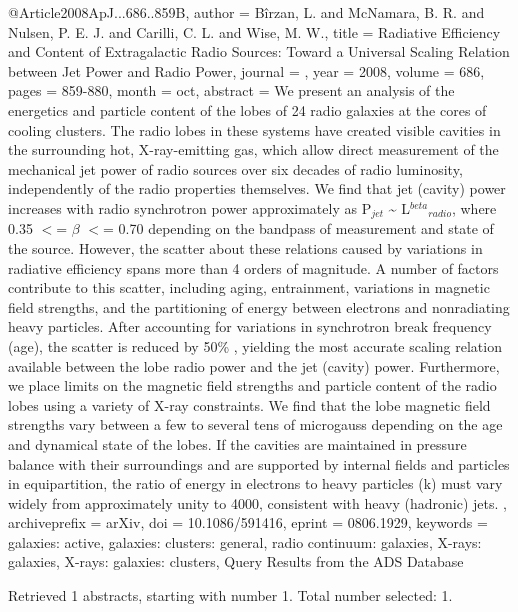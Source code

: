 \documentclass[longauth]{aa}
\begin{document}
{{{{{{{{{{@Article{2008ApJ...686..859B,
  author        = {B{\^i}rzan, L. and McNamara, B. R. and Nulsen, P. E. J. and Carilli, C. L. and Wise, M. W.},
  title         = {Radiative Efficiency and Content of Extragalactic Radio Sources: Toward a Universal Scaling Relation between Jet Power and Radio Power},
  journal       = {\apj},
  year          = {2008},
  volume        = {686},
  pages         = {859-880},
  month         = oct,
  abstract      = {We present an analysis of the energetics and particle content of the
lobes of 24 radio galaxies at the cores of cooling clusters. The radio
lobes in these systems have created visible cavities in the surrounding
hot, X-ray-emitting gas, which allow direct measurement of the
mechanical jet power of radio sources over six decades of radio
luminosity, independently of the radio properties themselves. We find
that jet (cavity) power increases with radio synchrotron power
approximately as P$_{jet}$ \~{} L$^{beta}$$_{radio}$,
where 0.35 $\lt$= {$\beta$} $\lt$= 0.70 depending on the bandpass of
measurement and state of the source. However, the scatter about these
relations caused by variations in radiative efficiency spans more than 4
orders of magnitude. A number of factors contribute to this scatter,
including aging, entrainment, variations in magnetic field strengths,
and the partitioning of energy between electrons and nonradiating heavy
particles. After accounting for variations in synchrotron break
frequency (age), the scatter is reduced by {\ap}50\% , yielding the most
accurate scaling relation available between the lobe radio power and the
jet (cavity) power. Furthermore, we place limits on the magnetic field
strengths and particle content of the radio lobes using a variety of
X-ray constraints. We find that the lobe magnetic field strengths vary
between a few to several tens of microgauss depending on the age and
dynamical state of the lobes. If the cavities are maintained in pressure
balance with their surroundings and are supported by internal fields and
particles in equipartition, the ratio of energy in electrons to heavy
particles (k) must vary widely from approximately unity to 4000,
consistent with heavy (hadronic) jets.
},
  archiveprefix = {arXiv},
  doi           = {10.1086/591416},
  eprint        = {0806.1929},
  keywords      = {galaxies: active, galaxies: clusters: general, radio continuum: galaxies, X-rays: galaxies, X-rays: galaxies: clusters},
}
Query Results from the ADS Database


Retrieved 1 abstracts, starting with number 1.  Total number selected: 1.

}}}}}}}}}}
\end{document}
